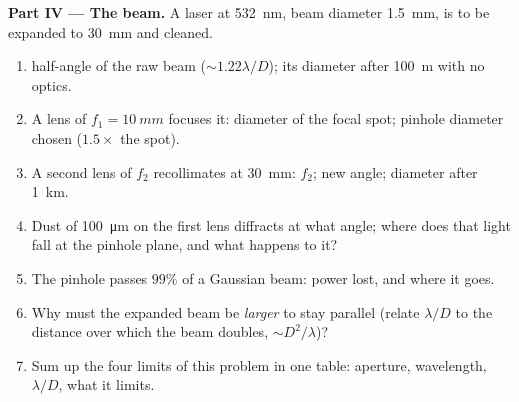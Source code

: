 \begin{problem}
\medskip
\noindent\textbf{Part IV --- The beam.}
A laser at \qty{532}{nm}, beam diameter \qty{1.5}{mm}, is to be expanded to
\qty{30}{mm} and cleaned.
\begin{enumerate}[resume]
  \item {} half-angle of the raw beam ($\sim1.22\lambda/D$); its
        diameter after \qty{100}{m} with no optics.
  \item A lens of $f_1 = \qty{10}{mm}$ focuses it: diameter of the focal spot;
        pinhole diameter chosen ($1.5\times$ the spot).
  \item A second lens of $f_2$ recollimates at \qty{30}{mm}: $f_2$; new
         angle; diameter after \qty{1}{km}.
  \item Dust of \qty{100}{\micro m} on the first lens diffracts at what angle;
        where does that light fall at the pinhole plane, and what
        happens to it?
  \item The pinhole passes $99\%$ of a Gaussian beam: power lost, and
        where it goes.
  \item Why must the expanded beam be \emph{larger} to stay parallel
        (relate $\lambda/D$ to the distance over which the beam doubles,
        $\sim D^2/\lambda$)?
  \item Sum up the four limits of this problem in one table: aperture,
        wavelength, $\lambda/D$, what it limits.
\end{enumerate}
\end{problem}
